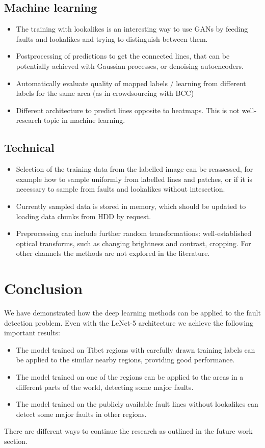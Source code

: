 \documentclass[11pt,a4paper]{article}
\begin{document}
\subsection{Machine learning}
    \begin{itemize}
        \item The training with lookalikes is an interesting way to use GANs by feeding faults and lookalikes and trying to
            distinguish between them.
        \item Postprocessing of predictions to get the connected lines, that can be potentially achieved with Gaussian processes,
            or denoising autoencoders.
        \item Automatically evaluate quality of mapped labels / learning from different labels for the same area (as in
            crowdsourcing with BCC)
        \item Different architecture to predict lines opposite to heatmaps. This is not well-research topic in machine learning.
    \end{itemize}
\subsection{Technical}
    \begin{itemize}
        \item Selection of the training data from the labelled image can be reassessed, for example how to sample
            uniformly from labelled lines and patches, or if it is necessary to sample from faults and lookalikes without
            intesection.
        \item Currently sampled data is stored in memory, which should be updated to loading data chunks from HDD by request.
        \item Preprocessing can include further random transformations: well-established optical transforms, such as changing
            brightness and contrast, cropping. For other channels the methods are not explored in the literature.
    \end{itemize}

\section{Conclusion}
We have demonstrated how the deep learning methods can be applied to the fault detection problem. Even with the LeNet-5
architecture we achieve the following important results:
\begin{itemize}
    \item The model trained on Tibet regions with carefully drawn training labels can be applied to the similar
    nearby regions, providing good performance.
    \item The model trained on one of the regions can be applied to the areas in a different parts of the world,
    detecting some major faults.
    \item The model trained on the publicly available fault lines without lookalikes can detect some major faults in other regions.
\end{itemize}
There are different ways to continue the research as outlined in the future work section.
\end{document}
